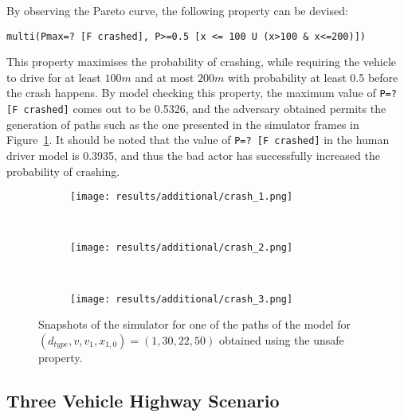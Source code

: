 By observing the Pareto curve, the following property can be devised:

\begin{minipage}{\linewidth}
{\vspace{1em}
\begin{lstlisting}
multi(Pmax=? [F crashed], P>=0.5 [x <= 100 U (x>100 & x<=200)])
\end{lstlisting}
}
\end{minipage}

This property maximises the probability of crashing, while requiring the vehicle to drive for at least $100m$ and at most $200m$ with probability at least 0.5 before the crash happens. By model checking this property, the maximum value of \texttt{P=? [F crashed]} comes out to be 0.5326, and the adversary obtained permits the generation of paths such as the one presented in the simulator frames in Figure~\ref{fig:unsafe_sim}. It should be noted that the value of \texttt{P=? [F crashed]} in the human driver model is 0.3935, and thus the bad actor has successfully increased the probability of crashing. 

\vspace{1em}
\begin{figure}[H]
\centering
\begin{subfigure}{0.75\textwidth}
  \centering
  \texttt{[image: results/additional/crash\_1.png]}
\end{subfigure}\\ \vspace{2px}
\begin{subfigure}{0.75\textwidth}
  \centering
  \texttt{[image: results/additional/crash\_2.png]}
\end{subfigure} \\ \vspace{2px}
\begin{subfigure}{0.75\textwidth}
  \centering
  \texttt{[image: results/additional/crash\_3.png]}
\end{subfigure}
\caption{Snapshots of the simulator for one of the paths of the model for $(d_{type}, v, v_1, x_{1,0}) = (1, 30, 22, 50)$ obtained using the unsafe property.}
\label{fig:unsafe_sim}
\end{figure}

\subsection{Three Vehicle Highway Scenario}

